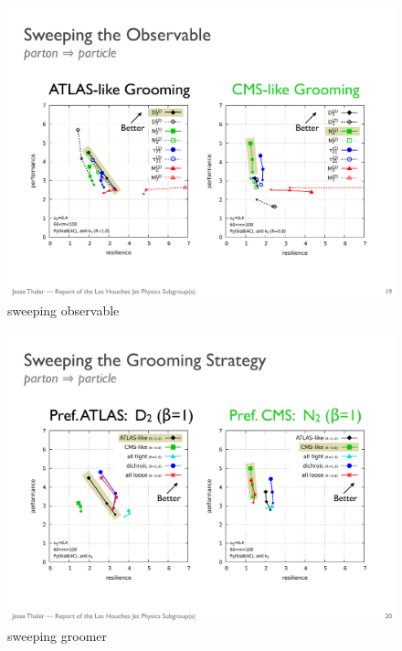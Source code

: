 \documentclass[11pt,letterpaper]{article}
\newcommand{\ijm}[1]{\textbf{\textcolor{llblue}{(#1 --ijm)}}}
\begin{document}
\begin{figure}
\begin{center}
\includegraphics[width=0.75\columnwidth]{figures/sweep_obs}
\end{center}
\caption{sweeping observable}
\label{fig:nolabel}
\end{figure}

\begin{figure}
\begin{center}
\includegraphics[width=0.75\columnwidth]{figures/sweep_groom}
\end{center}
\caption{sweeping groomer}
\label{fig:nolabel}
\end{figure}


\end{document}

